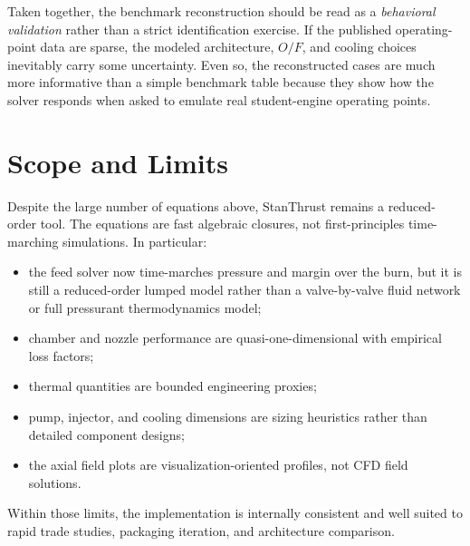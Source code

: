 \documentclass[11pt]{article}
\begin{document}
Taken together, the benchmark reconstruction should be read as a \emph{behavioral validation} rather than a strict identification exercise. If the published operating-point data are sparse, the modeled architecture, $O/F$, and cooling choices inevitably carry some uncertainty. Even so, the reconstructed cases are much more informative than a simple benchmark table because they show how the solver responds when asked to emulate real student-engine operating points.

\section{Scope and Limits}
Despite the large number of equations above, StanThrust remains a reduced-order tool. The equations are fast algebraic closures, not first-principles time-marching simulations. In particular:
\begin{itemize}[leftmargin=5mm]
\item the feed solver now time-marches pressure and margin over the burn, but it is still a reduced-order lumped model rather than a valve-by-valve fluid network or full pressurant thermodynamics model;
\item chamber and nozzle performance are quasi-one-dimensional with empirical loss factors;
\item thermal quantities are bounded engineering proxies;
\item pump, injector, and cooling dimensions are sizing heuristics rather than detailed component designs;
\item the axial field plots are visualization-oriented profiles, not CFD field solutions.
\end{itemize}

Within those limits, the implementation is internally consistent and well suited to rapid trade studies, packaging iteration, and architecture comparison.
\end{document}
